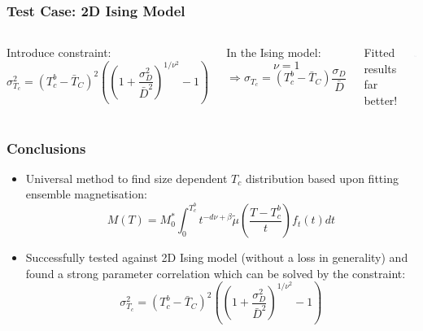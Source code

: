 \documentclass{beamer}
\begin{document}
\begin{frame}
	\frametitle{Test Case: 2D Ising Model}
	\begin{columns}
	\column{7cm}
		Introduce constraint\footnotemark[5]:
		$$
		\sigma_{T_c}^2 = (T_c^b - \bar{T}_C)^2\left(\left(1 + \frac{\sigma_D^2}{\bar{D}^2}\right)^{1/\nu^2}-1\right)
		$$

		In the Ising model:
		$$
		\nu = 1
		$$
		$$
		\Rightarrow \sigma_{T_c} = (T_c^b - \bar{T}_C)\frac{\sigma_D}{\bar{D}}
		$$
		\begin{center}\vspace{2mm}

		Fitted results far better!
		\end{center}
	\column{5cm}

		\includegraphics[width=4.5cm]{Images/constr}
	\end{columns}
\end{frame}

\begin{frame}
	\frametitle{Conclusions}
	\small{
	\begin{itemize}
		\item{Universal method to find size dependent $T_c$ distribution based upon fitting ensemble magnetisation:}
		$$
		M(T) = M_0^*\int_0^{T_c^b} t^{-d\nu +\beta} \tilde{\mu}\left(\frac{T-T_c^b}{t}\right) f_t(t) dt
		$$
		\item{Successfully tested against 2D Ising model (without a loss in generality) and found a strong parameter correlation which can be solved by the constraint:}
		$$
		\sigma_{T_c}^2 = (T_c^b - \bar{T}_C)^2\left(\left(1 + \frac{\sigma_D^2}{\bar{D}^2}\right)^{1/\nu^2}-1\right)
		$$
	\end{itemize}}
\end{frame}
\end{document}
